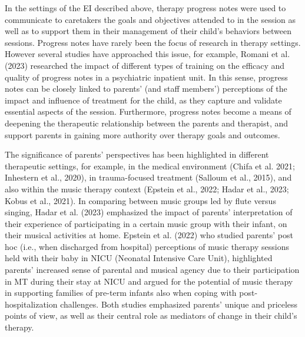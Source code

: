 \documentclass[authordate, empirical]{jote-new-article}
\begin{document}
	In the settings of the EI described above, therapy progress notes were used to communicate to caretakers the goals and objectives attended to in the session as well as to support them in their management of their child's behaviors between sessions. Progress notes have rarely been the focus of research in therapy settings. However several studies have approached this issue, for example, Romani et al. (2023) researched the impact of different types of training on the efficacy and quality of progress notes in a psychiatric inpatient unit. In this sense, progress notes can be closely linked to parents' (and staff members') perceptions of the impact and influence of treatment for the child, as they capture and validate essential aspects of the session. Furthermore, progress notes become a means of deepening the therapeutic relationship between the parents and therapist, and support parents in gaining more authority over therapy goals and outcomes.



	The significance of parents' perspectives has been highlighted in different therapeutic settings, for example, in the medical environment (Chifa et al. 2021; Inhestern et al., 2020), in trauma-focused treatment (Salloum et al., 2015), and also within the music therapy context (Epstein et al., 2022; Hadar et al., 2023; Kobus et al., 2021). In comparing between music groups led by flute versus singing, Hadar et al. (2023) emphasized the impact of parents' interpretation of their experience of participating in a certain music group with their infant, on their musical activities at home. Epstein et al. (2022) who studied parents' post hoc (i.e., when discharged from hospital) perceptions of music therapy sessions held with their baby in NICU (Neonatal Intensive Care Unit), highlighted parents' increased sense of parental and musical agency due to their participation in MT during their stay at NICU and argued for the potential of music therapy in supporting families of pre-term infants also when coping with post-hospitalization challenges. Both studies emphasized parents' unique and priceless points of view, as well as their central role as mediators of change in their child's therapy.
\end{document}
